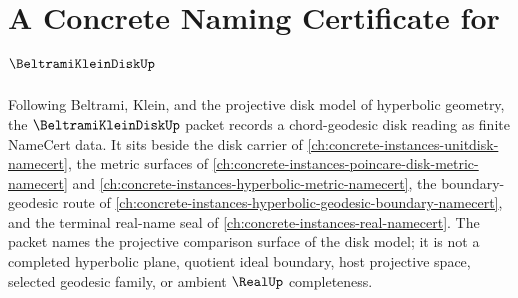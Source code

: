 \chapter{A Concrete Naming Certificate for $\BeltramiKleinDiskUp$}
\label{ch:concrete-instances-beltrami-klein-disk-namecert}

Following Beltrami, Klein, and the projective disk model of hyperbolic geometry, the $\BeltramiKleinDiskUp$ packet records a chord-geodesic disk reading as finite NameCert data. It sits beside the disk carrier of \autoref{ch:concrete-instances-unitdisk-namecert}, the metric surfaces of \autoref{ch:concrete-instances-poincare-disk-metric-namecert} and \autoref{ch:concrete-instances-hyperbolic-metric-namecert}, the boundary-geodesic route of \autoref{ch:concrete-instances-hyperbolic-geodesic-boundary-namecert}, and the terminal real-name seal of \autoref{ch:concrete-instances-real-namecert}. The packet names the projective comparison surface of the disk model; it is not a completed hyperbolic plane, quotient ideal boundary, host projective space, selected geodesic family, or ambient $\RealUp$ completeness.

